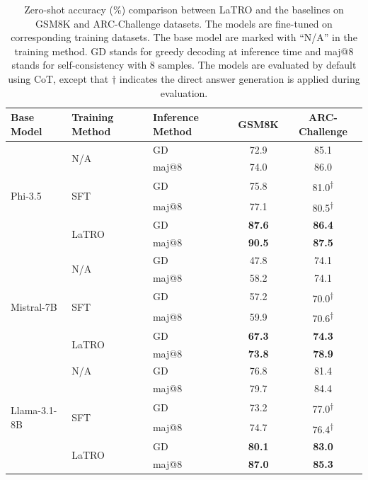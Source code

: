 \begin{table}[t]
    \caption{Zero-shot accuracy (\%) comparison between LaTRO and the baselines on GSM8K and ARC-Challenge datasets. The models are fine-tuned on corresponding training datasets. The base model are marked with ``N/A'' in the training method. GD stands for greedy decoding at inference time and maj@8 stands for self-consistency with 8 samples. The models are evaluated by default using CoT, except that $\dagger$ indicates the direct answer generation is applied during evaluation. }
    \label{tab:main_experiment}
    \begin{center}
    \def\arraystretch{1.3}
    \begin{tabular}{lllcc}
        \toprule
        \bf Base Model & \bf Training Method & \bf Inference Method & \bf GSM8K  & \bf ARC-Challenge \\ 
        \hline
        \multirow{6}{*}{Phi-3.5} & \multirow{2}{*}{N/A} & GD & 72.9 & 85.1 \\
        & & maj@8 & 74.0 & 86.0 \\
        & \multirow{2}{*}{SFT} & GD & 75.8 & 81.0\textsuperscript{$\dagger$} \\
        & & maj@8 & 77.1 & 80.5\textsuperscript{$\dagger$} \\
        & \multirow{2}{*}{LaTRO} & GD & \bf 87.6 & \bf 86.4 \\
        & & maj@8 & \bf 90.5 & \bf 87.5\\
        \hline
        \multirow{6}{*}{Mistral-7B} & \multirow{2}{*}{N/A} & GD & 47.8 & 74.1 \\
        & & maj@8 & 58.2 & 74.1 \\
        & \multirow{2}{*}{SFT} & GD & 57.2 & 70.0\textsuperscript{$\dagger$} \\
        & & maj@8 & 59.9 & 70.6\textsuperscript{$\dagger$} \\
        & \multirow{2}{*}{LaTRO} & GD& \bf 67.3 & \bf 74.3 \\
        & & maj@8 & \bf 73.8 & \bf 78.9 \\
        \hline
        \multirow{6}{*}{Llama-3.1-8B} & N/A & GD & 76.8 & 81.4\\
        & & maj@8 & 79.7 & 84.4 \\
        &  \multirow{2}{*}{SFT} & GD & 73.2 & 77.0\textsuperscript{$\dagger$} \\
        & & maj@8 & 74.7 & 76.4\textsuperscript{$\dagger$} \\
        & \multirow{2}{*}{LaTRO} & GD& \bf 80.1 & \bf 83.0 \\
        & & maj@8 & \bf 87.0 & \bf 85.3\\
        \bottomrule
    \end{tabular}
    \end{center}
    
\end{table}


